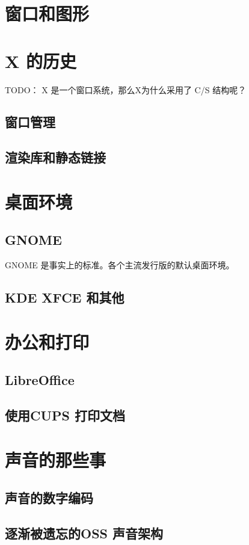 \documentclass[amstex]{ctexbook}
\begin{document}
\section{窗口和图形}

\section{X 的历史}

TODO： X 是一个窗口系统，那么X为什么采用了 C/S 结构呢？
\subsection{ 窗口管理}
\subsection{ 渲染库和静态链接}
\section{桌面环境}
\subsection{GNOME}
GNOME 是事实上的标准。各个主流发行版的默认桌面环境。
\subsection{ KDE XFCE 和其他}

\section{  办公和打印	}
\subsection{  LibreOffice	}
\subsection{使用CUPS 打印文档	}
\section{ 声音的那些事	}
\subsection{  声音的数字编码	}
\subsection{  逐渐被遗忘的OSS	声音架构}
\end{document}
